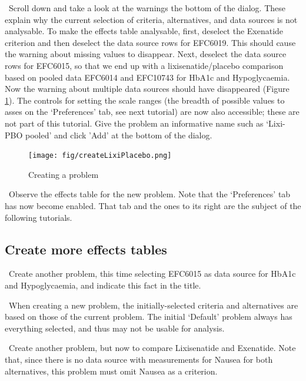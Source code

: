 \documentclass[00_mcda_tutorial.tex]{subfiles}
\begin{document}
\noindent \leftpointright \, Scroll down and take a look at the warnings the bottom of the dialog. These explain why the current selection of criteria, alternatives, and data sources is not analysable. To make the effects table analysable, first, deselect the Exenatide criterion and then deselect the data source rows for EFC6019. This should cause the warning about missing values to disappear. Next, deselect the data source rows for EFC6015, so that we end up with a lixisenatide/placebo comparison based on pooled data EFC6014 and EFC10743 for HbA1c and Hypoglycaemia. Now the warning about multiple data sources should have disappeared (Figure \ref{fig:create_lixi_placebo}). The controls for setting the scale ranges (the breadth of possible values to asses on the ‘Preferences’ tab, see next tutorial) are now also accessible; these are not part of this tutorial. Give the problem an informative name such as ‘Lixi-PBO pooled’ and click 'Add' at the bottom of the dialog.

\begin{figure}[!h]
    \centering
	\texttt{[image: fig/createLixiPlacebo.png]}
    \caption{Creating a problem}
	\label{fig:create_lixi_placebo}
\end{figure}

\noindent \leftpointright \, Observe the effects table for the new problem. Note that the ‘Preferences’ tab has now become enabled. That tab and the ones to its right are the subject of the following tutorials.

\subsection*{Create more effects tables}
\noindent \leftpointright \, Create another problem, this time selecting EFC6015 as data source for HbA1c and Hypoglycaemia, and indicate this fact in the title.
\newline

\noindent \faLightbulbO \, When creating a new problem, the initially-selected criteria and alternatives are based on those of the current problem. The initial ‘Default’ problem always has everything selected, and thus may not be usable for analysis.
\newline

\noindent \leftpointright \, Create another problem, but now to compare Lixisenatide and Exenatide. Note that, since there is no data source with measurements for Nausea for both alternatives, this problem must omit Nausea as a criterion.
\newline
\end{document}
